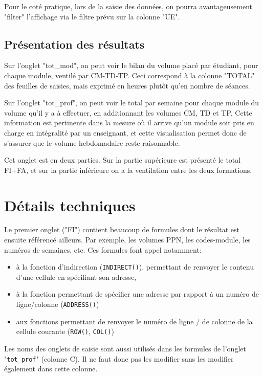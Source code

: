 \documentclass[12pt,a4paper]{article}
\begin{document}

Pour le coté pratique, lors de la saisie des données, on pourra avantageusement "filter" l'affichage via le filtre prévu sur la colonne "UE".

\subsection{Présentation des résultats}

Sur l'onglet "tot\_mod", on peut voir le bilan du volume placé par étudiant, pour chaque module, ventilé par CM-TD-TP.
Ceci correspond à la colonne "TOTAL" des feuilles de saisies, mais exprimé en heures plutôt qu'en nombre de séances.

Sur l'onglet "tot\_prof", on peut voir le total par semaine pour chaque module du volume qu'il y a à effectuer, en additionnant les volumes CM, TD et TP.
Cette information est pertinente dans la mesure où il arrive qu'un module soit pris en charge en intégralité par un enseignant, et cette visualisation permet donc de s'assurer que le volume hebdomadaire reste raisonnable.

Cet onglet est en deux parties.
Sur la partie supérieure est présenté le total FI+FA,
et sur la partie inférieure on a la ventilation entre les deux formations.


\section{Détails techniques}

Le premier onglet ("FI") contient beaucoup de formules dont le résultat est ensuite référencé ailleurs.
Par exemple, les volumes PPN, les codes-module, les numéros de semaines, etc.
Ces formules font appel notamment:
\begin{itemize}
\item à la fonction d'indirection ({\tt INDIRECT()}), permettant de renvoyer le contenu d'une cellule en spécifiant son adresse, 
\item à la fonction permettant de spécifier une adresse par rapport à un numéro de ligne/colonne ({\tt ADDRESS()})
\item aux fonctions permettant de renvoyer le numéro de ligne / de colonne de la cellule courante ({\tt ROW()}, {\tt COL()})
\end{itemize}

Les noms des onglets de saisie sont aussi utilisés dans les formules de l'onglet "{\tt tot\_prof}" (colonne C).
Il ne faut donc pas les modifier sans les modifier également dans cette colonne.
\end{document}
